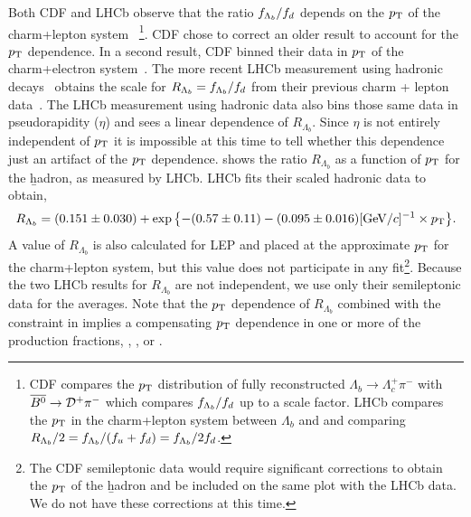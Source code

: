 Both CDF and LHCb observe that the ratio $f_{\Lambda_{b}}/f_{d}$ depends on the $p_{\rm T}$
of the charm+lepton system~\cite{Aaltonen:2008eu,Aaij:2011jp}%
\footnote{
  \label{foot:life_mix:Aaltonen:2008eu}
  CDF compares the $p_{\rm T}$ distribution of fully reconstructed 
  $\Lambda_b\rightarrow\Lambda_c^+ \pi^-$ 
  with $\overline{B^0}\rightarrow{\cal D}^+\pi^-$ which 
  compares $f_{\Lambda_{b}}/f_{d}$ up to a scale factor. LHCb compares the $p_{\rm T}$ 
  in the charm+lepton system between $\Lambda_b$ and \Bd and \Bu comparing 
  $R_{\Lambda_b}/2 = f_{\Lambda_{b}}/(f_{u}+f_{d}) = f_{\Lambda_{b}}/2f_{d}$.}. 
CDF chose to correct an older result to account for the $p_{\rm T}$ dependence.
In a second result, CDF binned their data in $p_{\rm T}$ of the charm+electron 
system~\cite{Aaltonen:2008zd}.
The more recent LHCb measurement using hadronic decays~\cite{Aaij:2014jyk} 
obtains the scale for $R_{\Lambda_b} = f_{\Lambda_{b}}/f_{d}$ from their previous 
charm + lepton data~\cite{Aaij:2011jp}.  The LHCb measurement using hadronic
data also bins those same data in pseudorapidity ($\eta$) and sees a 
linear dependence of $R_{\Lambda_b}$.  Since $\eta$ is not entirely
independent of $p_{\rm T}$ it is impossible at this time to tell whether 
this dependence just an artifact of the $p_{\rm T}$ dependence.
 shows the ratio $R_{\Lambda_b}$ as a function of 
$p_{\rm T}$ for the \b hadron, as measured by LHCb.  LHCb fits their
scaled hadronic data to obtain,
\begin{equation}
R_{\Lambda_b} = (0.151\pm 0.030) + 
  \exp{\left\{-(0.57\pm 0.11) - 
  (0.095\pm 0.016)[{\rm GeV}/c]^{-1} \times p_{\rm T}\right\}}.
\end{equation}
A value of
$R_{\Lambda_b}$ is also calculated for LEP and placed at the approximate $p_{\rm T}$ for the charm+lepton
system, but this value does not participate in any fit\footnote{
  \label{foot:life_mix:Aaltonen:2008zd}
  The CDF semileptonic data would require significant corrections to obtain the $p_{\rm T}$ of the \b hadron and be included on the same plot with the LHCb data.
  We do not have these corrections at this time.}.
Because the two LHCb results for $R_{\Lambda_b}$ are not 
independent, we use only their semileptonic data for the averages.
Note that the $p_{\rm T}$ dependence
of $R_{\Lambda_b}$ combined with the constraint in  implies
a compensating $p_{\rm T}$ dependence in one or more of the production fractions, \fBu, \fBd,
or \fBs.

